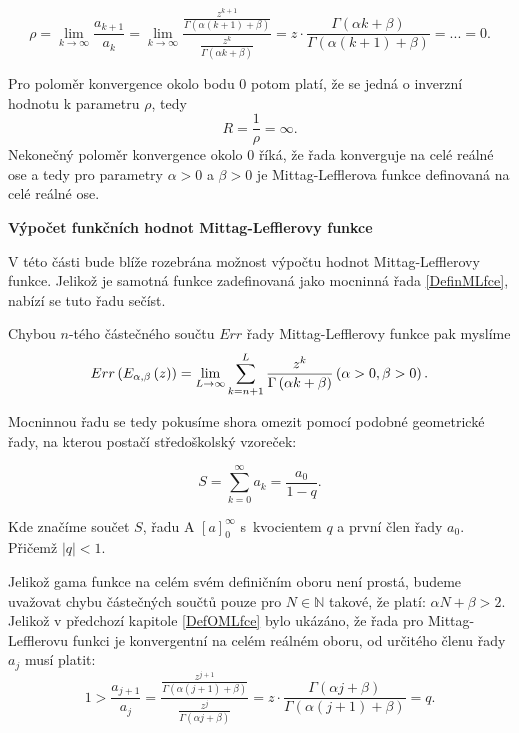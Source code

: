 \documentclass[a4paper,12pt,twoside]{article}
\theoremstyle{definition}
\newtheorem{defin}[veta]{Definice}
\theoremstyle{remark}
\numberwithin{equation}{section}
\numberwithin{table}{section}
\numberwithin{figure}{section}
\newcommand{\N}{\mathbb{N}}
\begin{document}
$$\rho = \lim_{k\to\infty} \frac{a_{k+1} }{a_{k}} = \lim_{k\to\infty} \frac{\frac{z^{k+1}}{\Gamma\left( \alpha \left(k+1\right) +\beta \right)}}{\frac{z^{k}}{\Gamma\left( \alpha k +\beta \right)} } = z \cdot \frac{\Gamma\left( \alpha k +\beta \right)}{\Gamma\left( \alpha \left(k+1\right) +\beta \right)} = ... = 0.$$

Pro poloměr konvergence okolo bodu 0 potom platí, že se jedná o inverzní hodnotu k parametru $\rho$, tedy
$$R = \frac{1}{\rho} = \infty.$$
Nekonečný poloměr konvergence okolo $0$ říká, že řada konverguje na celé reálné ose a tedy pro parametry $\alpha > 0$ a $\beta > 0$ je Mittag-Lefflerova funkce definovaná na celé reálné ose.

\medskip
\noindent \textbf{Výpočet funkčních hodnot Mittag-Lefflerovy funkce}\label{DefOMLfce}

\medskip
\noindent V této části bude blíže rozebrána možnost výpočtu hodnot Mittag-Lefflerovy funkce. Jelikož je samotná funkce zadefinovaná jako mocninná řada \eqref{DefinMLfce}, nabízí se tuto řadu sečíst.

Chybou $n$-tého částečného součtu $Err$ řady Mittag-Lefflerovy funkce pak myslíme
\begin{equation} \label{ChybaSouctuRady}
	Err \left(E_{\alpha, \beta} \left( z\right)\right) = \lim_{L\to \infty} \sum_{k=n+1}^{L} \frac{z^{k}}{\Gamma\left( \alpha k +\beta \right)} \space \space \left( \alpha > 0, \beta > 0 \right).
\end{equation}

Mocninnou řadu se tedy pokusíme shora omezit pomocí podobné geometrické řady, na kterou postačí středoškolský vzoreček:

\begin{equation}\label{SoucetGeometrickeRady}
	S = \sum_{k=0}^{\infty} a_{k} = \frac{a_{0}}{1-q}.
\end{equation} 

Kde značíme součet $S$, řadu A $\left[a\right]_{0}^{\infty}$ s~kvocientem $q$ a první člen řady $a_0$. Přičemž $ |q| < 1$.

Jelikož gama funkce na celém svém definičním oboru není prostá, budeme uvažovat chybu částečných součtů pouze pro $N \in \N$ takové, že platí: $\alpha N + \beta > 2$.
Jelikož v předchozí kapitole \ref{DefOMLfce} bylo ukázáno, že řada pro Mittag-Lefflerovu funkci je konvergentní na celém reálném oboru, od určitého členu řady $a_j$ musí platit:
$$1 > \frac{ a_{j+1}}{a_{j}} = \frac{\frac{z^{j+1}}{\Gamma\left(\alpha \left(j+1\right) + \beta\right)}}{\frac{z^{j}}{\Gamma\left(\alpha j + \beta\right)}} = z \cdot \frac{\Gamma \left(\alpha j + \beta\right)}{\Gamma \left(\alpha \left(j+1\right) + \beta\right)} = q.$$
\end{document}
